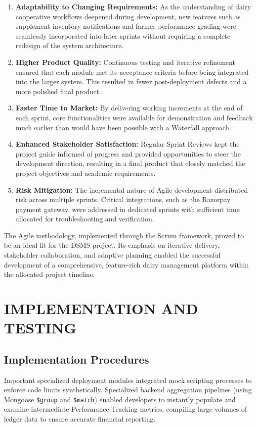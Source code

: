 \documentclass[12pt,a4paper]{report}
\begin{document}
\begin{enumerate}
    \item \textbf{Adaptability to Changing Requirements:} As the understanding of dairy cooperative workflows deepened during development, new features such as supplement inventory notifications and farmer performance grading were seamlessly incorporated into later sprints without requiring a complete redesign of the system architecture.
    \item \textbf{Higher Product Quality:} Continuous testing and iterative refinement ensured that each module met its acceptance criteria before being integrated into the larger system. This resulted in fewer post-deployment defects and a more polished final product.
    \item \textbf{Faster Time to Market:} By delivering working increments at the end of each sprint, core functionalities were available for demonstration and feedback much earlier than would have been possible with a Waterfall approach.
    \item \textbf{Enhanced Stakeholder Satisfaction:} Regular Sprint Reviews kept the project guide informed of progress and provided opportunities to steer the development direction, resulting in a final product that closely matched the project objectives and academic requirements.
    \item \textbf{Risk Mitigation:} The incremental nature of Agile development distributed risk across multiple sprints. Critical integrations, such as the Razorpay payment gateway, were addressed in dedicated sprints with sufficient time allocated for troubleshooting and verification.
\end{enumerate}

The Agile methodology, implemented through the Scrum framework, proved to be an ideal fit for the DSMS project. Its emphasis on iterative delivery, stakeholder collaboration, and adaptive planning enabled the successful development of a comprehensive, feature-rich dairy management platform within the allocated project timeline.

\chapter{IMPLEMENTATION AND TESTING}
\section{Implementation Procedures}
Important specialized deployment modules integrated mock scripting processes to enforce code limits synthetically. Specialized backend aggregation pipelines (using Mongoose \texttt{\$group} and \texttt{\$match}) enabled developers to instantly populate and examine intermediate Performance Tracking metrics, compiling large volumes of ledger data to ensure accurate financial reporting.
\end{document}
